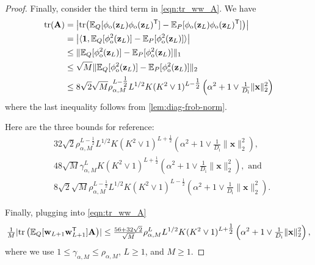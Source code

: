 \documentclass[twoside]{article}
\renewcommand{\ss}[1]{_{\text{#1}}}
\newcommand{\vw}{\mathbf{w}}
\newcommand{\vx}{\mathbf{x}}
\newcommand{\vz}{\mathbf{z}}
\newcommand{\vone}{\mathbf{1}}
\newcommand{\mA}{\mathbf{A}}
\newcommand{\E}{\mathbb{E}}
\renewcommand{\P}{\mathbb{P}}
\newcommand{\Q}{\mathbb{Q}}
\renewcommand{\Q}{\ensuremath{Q}}
\renewcommand{\P}{\ensuremath{P}}
\newcommand{\T}{\text{\textsf{T}}}
\newcommand{\opspace}{}
\newcommand{\tr}{\operatorname{tr}\opspace}
\renewcommand{\ss}[1]{_{\text{#1}}}        %
\DeclarePairedDelimiter\parens{(}{)}             %
\DeclarePairedDelimiter\norm{\|}{\|}             %
\DeclarePairedDelimiter\abs{|}{|}                %
\theoremstyle{theoremstyle}
\begin{document}
\begin{proof}
Finally, consider the third term in \cref{eqn:tr_ww_A}. We have
\begin{align}
    \tr(\mA) 
    &= \left\lvert \mathrm{tr}\parens*{\E_{\Q}[\phi\ss{o}(\vz_{L})\phi\ss{o}(\vz_{L})^\T]-\E_{\P}[\phi\ss{o}(\vz_{L})\phi\ss{o}(\vz_{L})^\T]} \right\rvert \\
    &= \left\lvert \langle \vone, \E_{\Q}[\phi\ss{o}^2(\vz_{L}) ] - \E_{\P}[\phi\ss{o}^2(\vz_{L}) ] \rangle \right\rvert
    \\
    &\le \norm{\E_{\Q}[\phi\ss{o}^2(\vz_{L}) ] - \E_{\P}[\phi\ss{o}^2(\vz_{L}) ]}_1
    \\
    &\le \sqrt{M} \norm{\E_{\Q}[\phi\ss{o}^2(\vz_{L}) ] - \E_{\P}[\phi\ss{o}^2(\vz_{L}) ]}_2
    \\
    &\le 8 \sqrt{2} \sqrt{M} \rho_{\alpha, M}^{L-\tfrac12} L^{1/2} K (K^2 \lor 1)^{L-\tfrac12}\left(\alpha^2 + 1\lor \tfrac1{D\ss{i}}\|\vx\|^2_2\right)
\end{align}
where the last inequality follows from \cref{lem:diag-frob-norm}.

Here are the three bounds for reference:
\begin{align}
    & 32 \sqrt{2} \rho_{\alpha, M}^{L-\tfrac12} L^{1/2} K (K^2 \lor 1)^{L+\tfrac12}\left(\alpha^2 + 1\lor \tfrac1{D\ss{i}}\|\vx\|^2_2\right),
    \\
    & 48\sqrt{M} \gamma_{\alpha,M}^L K (K^2 \lor 1)^{L+\tfrac12}\left(\alpha^2 + 1\lor \tfrac1{D\ss{i}}\|\vx\|^2_2\right), \text{ and}
    \\
    & 8 \sqrt{2} \sqrt{M} \rho_{\alpha, M}^{L-\tfrac12} L^{1/2} K (K^2 \lor 1)^{L-\tfrac12}\left(\alpha^2 + 1\lor \tfrac1{D\ss{i}}\|\vx\|^2_2\right).
\end{align}

Finally, plugging into \cref{eqn:tr_ww_A}
\begin{align}
    \tfrac{1}{M}\abs{\tr \left( \E_{Q}[\vw_{L+1} \vw_{L+1}^\T] \mA \right)} 
    \le \tfrac{56 + 32\sqrt{2}}{\sqrt{M}} \rho_{\alpha, M}^{L} L^{1/2} K (K^2 \lor 1)^{L+\tfrac12}\left(\alpha^2 + 1\lor \tfrac1{D\ss{i}}\|\vx\|^2_2\right),
\end{align}
where we use $1\le \gamma_{\alpha, M} \le \rho_{\alpha, M}$, $L\ge 1$, and $M\ge 1$.
\end{proof}
\end{document}
